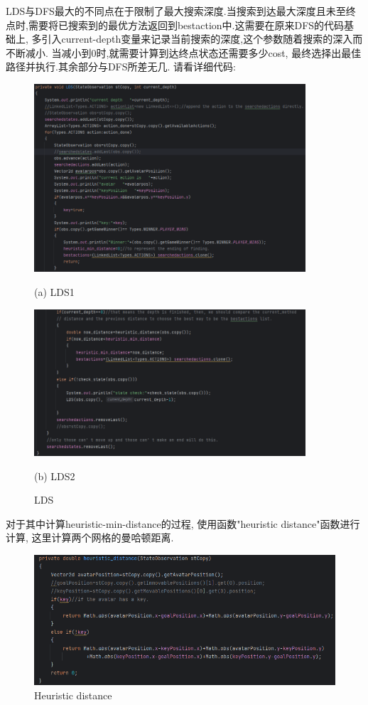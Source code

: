 \documentclass{article}
\begin{document}
LDS与DFS最大的不同点在于限制了最大搜索深度.当搜索到达最大深度且未至终点时,需要将已搜索到的最优方法返回到bestaction中.这需要在原来DFS的代码基础上, 多引入current-depth变量来记录当前搜索的深度,这个参数随着搜索的深入而不断减小. 当减小到0时,就需要计算到达终点状态还需要多少cost, 最终选择出最佳路径并执行.其余部分与DFS所差无几.
请看详细代码:
\begin{figure}[htbp]
\begin{minipage}[t]{0.5\linewidth}
\centering
\includegraphics[width=0.9\textwidth]{LDS1}
\centerline{(a) LDS1}
\end{minipage}%
\begin{minipage}[t]{0.5\linewidth}
\centering
\includegraphics[width=0.9\textwidth]{LDS2}
\centerline{(b) LDS2}
\end{minipage}
\caption{LDS}
\end{figure}

对于其中计算heuristic-min-distance的过程, 使用函数"heuristic distance"函数进行计算, 这里计算两个网格的曼哈顿距离.
\begin{figure}
\centering
\includegraphics[width=0.6\linewidth]{heuristic LDS}
\caption{Heuristic distance}
\end{figure}
\end{document}
